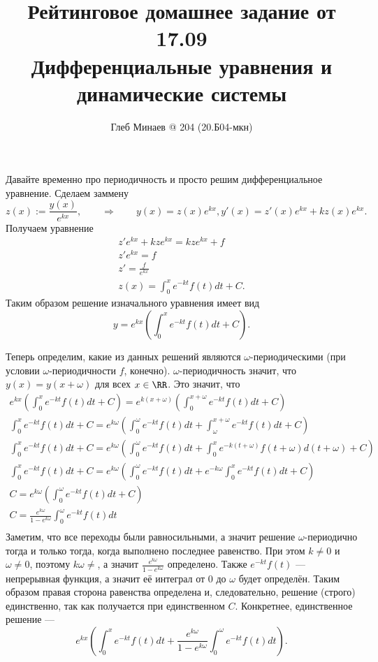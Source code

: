 \documentclass[12pt,a4paper]{article}
\title{Рейтинговое домашнее задание от 17.09\\Дифференциальные уравнения и динамические системы}
\author{Глеб Минаев @ 204 (20.Б04-мкн)}
\date{}
\begin{document}
    \maketitle

    \begin{problem}{2}
        Давайте временно про периодичность и просто решим дифференциальное уравнение. Сделаем заммену
        \[
            z(x) := \frac{y(x)}{e^{kx}},
            \qquad \Longrightarrow \qquad
            y(x) = z(x) e^{kx},
            y'(x) = z'(x) e^{kx} + k z(x) e^{kx}.
        \]
        Получаем уравнение
        \begin{gather*}
            z' e^{kx} + k z e^{kx} = k z e^{kx} + f\\
            z' e^{kx} = f\\
            z' = \frac{f}{e^{kx}}\\
            z(x) = \int_0^x e^{-kt} f(t) dt + C.
        \end{gather*}
        Таким образом решение изначального уравнения имеет вид
        \[y = e^{kx} \left(\int_0^x e^{-kt} f(t) dt + C\right).\]

        Теперь определим, какие из данных решений являются $\omega$-периодическими (при условии $\omega$-периодичности $f$, конечно). $\omega$-периодичность значит, что $y(x) = y(x+\omega)$ для всех $x \in \RR$. Это значит, что
        \begin{gather*}
            e^{kx} \left(\int_0^x e^{-kt} f(t) dt + C\right) = e^{k(x + \omega)} \left(\int_0^{x + \omega} e^{-kt} f(t) dt + C\right)\\
            \int_0^x e^{-kt} f(t) dt + C = e^{k\omega} \left(\int_0^\omega e^{-kt} f(t) dt + \int_\omega^{x + \omega} e^{-kt} f(t) dt + C\right)\\
            \int_0^x e^{-kt} f(t) dt + C = e^{k\omega} \left(\int_0^\omega e^{-kt} f(t) dt + \int_0^x e^{-k(t + \omega)} f(t + \omega) d(t + \omega) + C\right)\\
            \int_0^x e^{-kt} f(t) dt + C = e^{k\omega} \left(\int_0^\omega e^{-kt} f(t) dt + e^{-k\omega} \int_0^x e^{-kt} f(t) dt + C\right)\\
            C = e^{k\omega} \left(\int_0^\omega e^{-kt} f(t) dt + C\right)\\
            C = \frac{e^{k\omega}}{1 - e^{k\omega}} \int_0^\omega e^{-kt} f(t) dt\\
        \end{gather*}
        Заметим, что все переходы были равносильными, а значит решение $\omega$-периодично тогда и только тогда, когда выполнено последнее равенство. При этом $k \neq 0$ и $\omega \neq 0$, поэтому $k\omega \neq$, а значит $\frac{e^{k\omega}}{1 - e^{k\omega}}$ определено. Также $e^{-kt} f(t)$ --- непрерывная функция, а значит её интеграл от $0$ до $\omega$ будет определён. Таким образом правая сторона равенства определена и, следовательно, решение (строго) единственно, так как получается при единственном $C$. Конкретнее, единственное решение ---
        \[e^{kx} \left(\int_0^x e^{-kt} f(t) dt + \frac{e^{k\omega}}{1 - e^{k\omega}} \int_0^\omega e^{-kt} f(t) dt\right).\]
    \end{problem}
\end{document}
